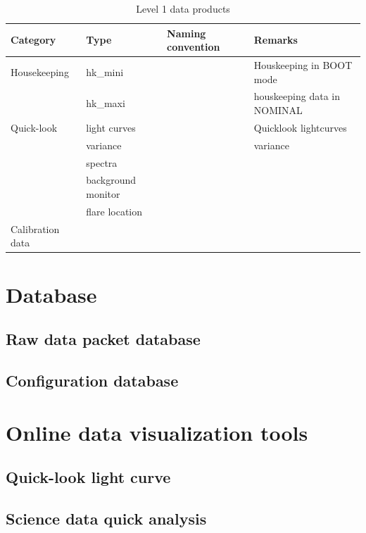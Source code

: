 \documentclass{aa}
\begin{document}
\begin{table}
\centering
\caption{Level 1 data products}
\begin{tabular}{llll}
Category & Type   &  Naming convention  & Remarks   \\ \hline
 Housekeeping & hk\_mini  &  & Houskeeping in BOOT mode   \\
 & hk\_maxi  &  & houskeeping data in NOMINAL   \\
 Quick-look &  light curves &  & Quicklook lightcurves \\
  &  variance &  & variance \\
  &  spectra &  &  \\
  &  background monitor &  &  \\
    &  flare location &  &  \\
 Calibration data &   &  &  \\
\end{tabular}
\end{table}


\section{Database}
\subsection{Raw data packet database } 
\subsection{Configuration database}

\section{Online data visualization tools}
\subsection{Quick-look light curve}
\subsection{Science data quick analysis}
\end{document}
